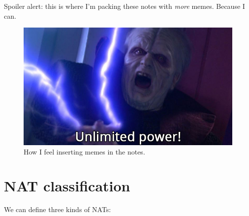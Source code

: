 Spoiler alert: this is where I'm packing these notes with \textit{more} memes. Because I can.

\begin{figure}[h]
    \centering
    \includegraphics[scale=0.2]{img/unlimited_power_meme.jpg}
    \decoRule
    \caption{How I feel inserting memes in the notes.}
    \label{fig:meme_unlimited_power_nat}
\end{figure}



\section{NAT classification}
\label{sec:nat_class}
We can define three kinds of NATs:

